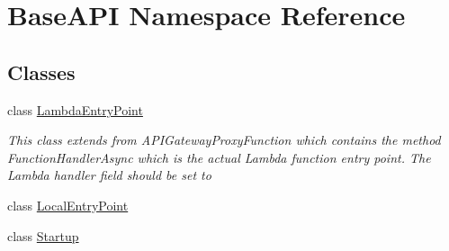 \hypertarget{namespace_base_a_p_i}{}\section{Base\+A\+PI Namespace Reference}
\label{namespace_base_a_p_i}
\subsection*{Classes}
\begin{DoxyCompactItemize}
\item 
class \mbox{\hyperlink{class_base_a_p_i_1_1_lambda_entry_point}{Lambda\+Entry\+Point}}
\begin{DoxyCompactList}\small\item\em This class extends from A\+P\+I\+Gateway\+Proxy\+Function which contains the method Function\+Handler\+Async which is the actual Lambda function entry point. The Lambda handler field should be set to \end{DoxyCompactList}\item 
class \mbox{\hyperlink{class_base_a_p_i_1_1_local_entry_point}{Local\+Entry\+Point}}
\item 
class \mbox{\hyperlink{class_base_a_p_i_1_1_startup}{Startup}}
\end{DoxyCompactItemize}

